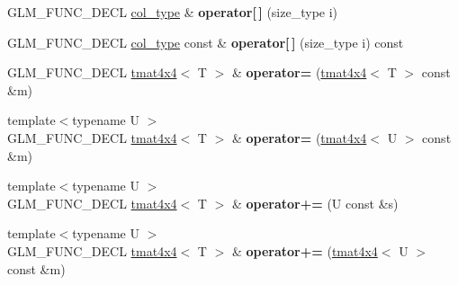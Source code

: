\begin{DoxyCompactItemize}
\item 
\hypertarget{structglm_1_1detail_1_1tmat4x4_ad46837a63dd4782368f5a2ed560ec290}{}G\+L\+M\+\_\+\+F\+U\+N\+C\+\_\+\+D\+E\+C\+L \hyperlink{structglm_1_1detail_1_1tvec4}{col\+\_\+type} \& {\bfseries operator\mbox{[}$\,$\mbox{]}} (size\+\_\+type i)\label{structglm_1_1detail_1_1tmat4x4_ad46837a63dd4782368f5a2ed560ec290}

\item 
\hypertarget{structglm_1_1detail_1_1tmat4x4_abab1ebc5f1c69ffcd82adf3a61be5f5b}{}G\+L\+M\+\_\+\+F\+U\+N\+C\+\_\+\+D\+E\+C\+L \hyperlink{structglm_1_1detail_1_1tvec4}{col\+\_\+type} const \& {\bfseries operator\mbox{[}$\,$\mbox{]}} (size\+\_\+type i) const \label{structglm_1_1detail_1_1tmat4x4_abab1ebc5f1c69ffcd82adf3a61be5f5b}

\item 
\hypertarget{structglm_1_1detail_1_1tmat4x4_a427ed01d537b6650b3300bb07050d139}{}G\+L\+M\+\_\+\+F\+U\+N\+C\+\_\+\+D\+E\+C\+L \hyperlink{structglm_1_1detail_1_1tmat4x4}{tmat4x4}$<$ T $>$ \& {\bfseries operator=} (\hyperlink{structglm_1_1detail_1_1tmat4x4}{tmat4x4}$<$ T $>$ const \&m)\label{structglm_1_1detail_1_1tmat4x4_a427ed01d537b6650b3300bb07050d139}

\item 
\hypertarget{structglm_1_1detail_1_1tmat4x4_a49cf680083f738e77055e11e46ed0f4a}{}{\footnotesize template$<$typename U $>$ }\\G\+L\+M\+\_\+\+F\+U\+N\+C\+\_\+\+D\+E\+C\+L \hyperlink{structglm_1_1detail_1_1tmat4x4}{tmat4x4}$<$ T $>$ \& {\bfseries operator=} (\hyperlink{structglm_1_1detail_1_1tmat4x4}{tmat4x4}$<$ U $>$ const \&m)\label{structglm_1_1detail_1_1tmat4x4_a49cf680083f738e77055e11e46ed0f4a}

\item 
\hypertarget{structglm_1_1detail_1_1tmat4x4_a5ae04a4d51a7be3536488cc59428596e}{}{\footnotesize template$<$typename U $>$ }\\G\+L\+M\+\_\+\+F\+U\+N\+C\+\_\+\+D\+E\+C\+L \hyperlink{structglm_1_1detail_1_1tmat4x4}{tmat4x4}$<$ T $>$ \& {\bfseries operator+=} (U const \&s)\label{structglm_1_1detail_1_1tmat4x4_a5ae04a4d51a7be3536488cc59428596e}

\item 
\hypertarget{structglm_1_1detail_1_1tmat4x4_af115a3229ac0defb1c4ac0a76d143cf6}{}{\footnotesize template$<$typename U $>$ }\\G\+L\+M\+\_\+\+F\+U\+N\+C\+\_\+\+D\+E\+C\+L \hyperlink{structglm_1_1detail_1_1tmat4x4}{tmat4x4}$<$ T $>$ \& {\bfseries operator+=} (\hyperlink{structglm_1_1detail_1_1tmat4x4}{tmat4x4}$<$ U $>$ const \&m)\label{structglm_1_1detail_1_1tmat4x4_af115a3229ac0defb1c4ac0a76d143cf6}


\end{DoxyCompactItemize}
